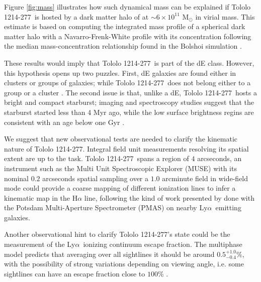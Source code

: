 \documentclass[a4paper,fleqn,usenatbib]{mnras}
\newcommand{\tol}{Tololo 1214-277}
\newcommand{\lya}{\ifmmode{{\rm Ly}\alpha}\else Ly$\alpha$\ \fi}
\begin{document}
Figure \ref{fig:mass} illustrates  how such dynamical
mass can be explained if \tol\ is hosted by a dark matter halo of at
$\sim 6\times 10^{11}$ M$_{\odot}$ in virial mass. 
This estimate is based on computing the integrated mass profile of a
spherical dark matter halo with a Navarro-Frenk-White profile with its
concentration following the median mass-concentration
relationship found in the Bolshoi simulation
\citep{2012MNRAS.423.3018P,2016ApJ...832..169P}.  

These results would imply that \tol\ is part of the dE
class. 
However, this hypothesis opens up two puzzles.
First, dE galaxies are found either in clusters or groups of
galaxies; while \tol\ does not belong either to a group or a cluster
\citep{2001AJ....121..169F}. 
The second issue is that, unlike a dE, \tol\ hosts a bright and compact
starburst; imaging and spectroscopy studies suggest that the
starburst started less than 4 Myr ago, while the low surface
brightness regins are consistent with an age below one Gyr
\citep{2001AJ....121..169F}.

We suggest that new observational tests are needed to clarify the
kinematic nature of \tol.
Integral field unit measurements resolving its spatial extent are up
to the task.  
\tol\ spans a region of $4$ arcseconds,
an instrument such as the Multi Unit Spectroscopic Explorer (MUSE)
\citep{2014Msngr.157...13B} with its nominal $0.2$ arcseconds spatial
sampling over a $1.0$ arcminute field in wide-field mode could provide
a coarse mapping of different ionization lines to infer a kinematic
map in the H$\alpha$ line, following the kind of work presented by
\citet{Herenz16} done with the Potsdam Multi-Aperture Spectrometer
(PMAS) \citep{PMAS} on nearby \lya emitting galaxies. 

Another observational hint to clarify \tol's state could be
the measurement of the \lya ionizing continuum escape fraction. 
The multiphase model predicts that averaging over all sightlines
it should be around $0.5^{+1.0}_{-0.4}$\%, with the possibility of strong
variations depending on viewing angle, i.e. some sightlines can have
an escape fraction close to $100\%$ \citep{Gronke2016}. 
\end{document}
